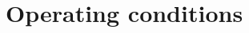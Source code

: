 \documentclass[fleqn,10pt]{SelfArx} %
\begin{document}
\flushbottom %

\maketitle %

\tableofcontents %

\thispagestyle{empty} %






\section{Operating conditions}
\end{document}
